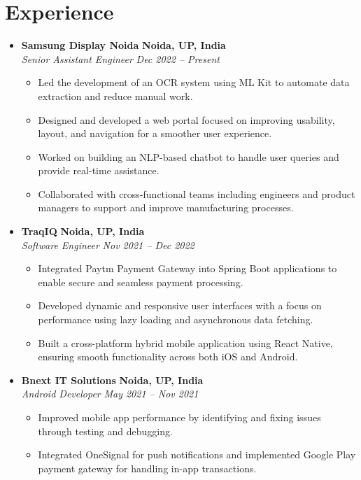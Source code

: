 \documentclass[10pt, a4paper]{article}
\begin{document}
\section*{Experience}
\begin{itemize}[leftmargin=0pt, itemsep=1ex, topsep=0.5ex, partopsep=0pt]

    \item
    \textbf{Samsung Display Noida} \hfill \textbf{Noida, UP, India} \\
    \textit{Senior Assistant Engineer} \hfill \textit{Dec 2022 -- Present}
    \begin{itemize}[leftmargin=1.5em, itemsep=0.5ex, topsep=0.5ex]
        \item Led the development of an OCR system using ML Kit to automate data extraction and reduce manual work.
        \item Designed and developed a web portal focused on improving usability, layout, and navigation for a smoother user experience.
        \item Worked on building an NLP-based chatbot to handle user queries and provide real-time assistance.
        \item Collaborated with cross-functional teams including engineers and product managers to support and improve manufacturing processes.
    \end{itemize}

    \item
    \textbf{TraqIQ} \hfill \textbf{Noida, UP, India} \\
    \textit{Software Engineer} \hfill \textit{Nov 2021 -- Dec 2022}
    \begin{itemize}[leftmargin=1.5em, itemsep=0.5ex, topsep=0.5ex]
        \item Integrated Paytm Payment Gateway into Spring Boot applications to enable secure and seamless payment processing.
        \item Developed dynamic and responsive user interfaces with a focus on performance using lazy loading and asynchronous data fetching.
        \item Built a cross-platform hybrid mobile application using React Native, ensuring smooth functionality across both iOS and Android.
    \end{itemize}

    \item
    \textbf{Bnext IT Solutions} \hfill \textbf{Noida, UP, India} \\
    \textit{Android Developer} \hfill \textit{May 2021 -- Nov 2021}
    \begin{itemize}[leftmargin=1.5em, itemsep=0.5ex, topsep=0.5ex]
        \item Improved mobile app performance by identifying and fixing issues through testing and debugging.
        \item Integrated OneSignal for push notifications and implemented Google Play payment gateway for handling in-app transactions.
    \end{itemize}


\end{itemize}
\end{document}
